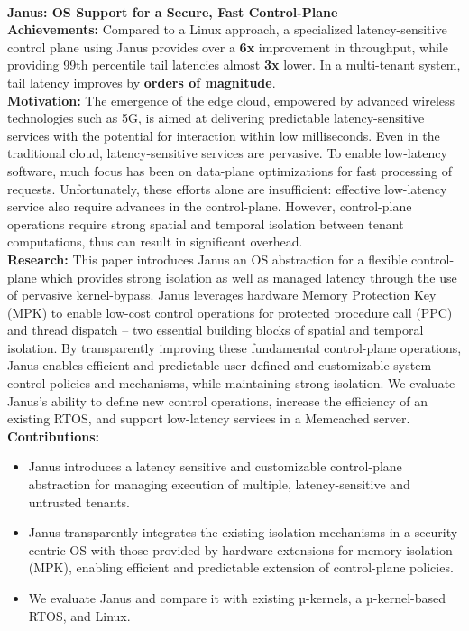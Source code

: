 \
\\
\textbf{Janus: OS Support for a Secure, Fast Control-Plane}
\\
\textbf{\small Achievements:}
Compared to a Linux approach, a specialized latency-sensitive control plane using Janus provides over a \textbf{6x} improvement in throughput, while providing 99th percentile tail latencies almost \textbf{3x} lower.
In a multi-tenant system, tail latency improves by \textbf{orders of magnitude}.
\\
\textbf{\small Motivation:}
The emergence of the edge cloud, empowered by advanced wireless technologies such as 5G, is aimed at delivering predictable latency-sensitive services with the potential for interaction within low milliseconds.
Even in the traditional cloud, latency-sensitive services are pervasive.
To enable low-latency software, much focus has been on data-plane optimizations for fast processing of requests.
Unfortunately, these efforts alone are insufficient: effective low-latency service also require advances in the control-plane.
However, control-plane operations require strong spatial and temporal isolation between tenant computations, thus can result in significant overhead.
\\
\textbf{\small Research:}
This paper introduces Janus an OS abstraction for a flexible control-plane which provides strong isolation as well as managed latency through the use of pervasive kernel-bypass.
Janus leverages hardware Memory Protection Key (MPK) to enable low-cost control operations for protected procedure call (PPC) and thread dispatch -- two essential building blocks of spatial and temporal isolation.
By transparently improving these fundamental control-plane operations, Janus enables efficient and predictable user-defined and customizable system control policies and mechanisms, while maintaining strong isolation.
We evaluate Janus’s ability to define new control operations, increase the efficiency of an existing RTOS, and support low-latency services in a Memcached server.
\\
\textbf{\small Contributions:}
\begin{itemize}[leftmargin=*]
  \setlength\itemsep{-0.0em}
        \item Janus introduces a latency sensitive and customizable control-plane abstraction for managing execution of multiple, latency-sensitive and untrusted tenants.
        \item Janus transparently integrates the existing isolation mechanisms in a security-centric OS with those provided by hardware extensions for memory isolation (MPK), enabling efficient and predictable extension of control-plane policies.
        \item We evaluate Janus and compare it with existing µ-kernels, a µ-kernel-based RTOS, and Linux.
\end{itemize}
